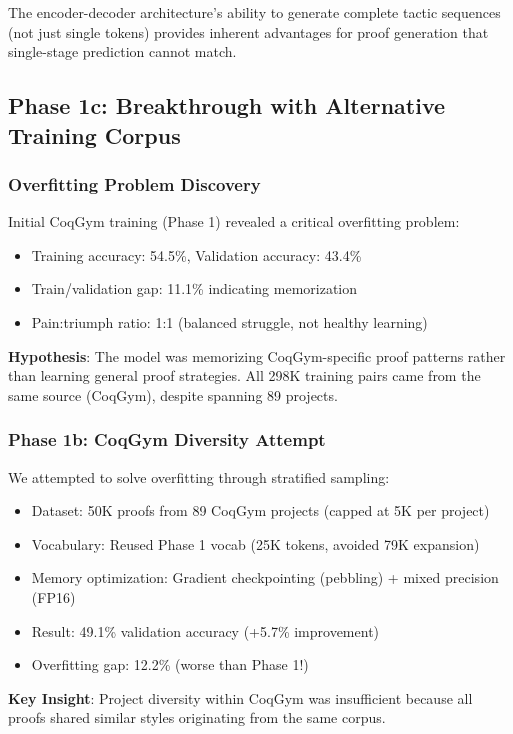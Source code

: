 \documentclass[12pt]{article}
\begin{document}
The encoder-decoder architecture's ability to generate complete tactic sequences (not just single tokens) provides inherent advantages for proof generation that single-stage prediction cannot match.

\subsection{Phase 1c: Breakthrough with Alternative Training Corpus}

\subsubsection{Overfitting Problem Discovery}

Initial CoqGym training (Phase 1) revealed a critical overfitting problem:
\begin{itemize}
\item Training accuracy: 54.5\%, Validation accuracy: 43.4\%
\item Train/validation gap: 11.1\% indicating memorization
\item Pain:triumph ratio: 1:1 (balanced struggle, not healthy learning)
\end{itemize}

\textbf{Hypothesis}: The model was memorizing CoqGym-specific proof patterns rather than learning general proof strategies. All 298K training pairs came from the same source (CoqGym), despite spanning 89 projects.

\subsubsection{Phase 1b: CoqGym Diversity Attempt}

We attempted to solve overfitting through stratified sampling:
\begin{itemize}
\item Dataset: 50K proofs from 89 CoqGym projects (capped at 5K per project)
\item Vocabulary: Reused Phase 1 vocab (25K tokens, avoided 79K expansion)
\item Memory optimization: Gradient checkpointing (pebbling) + mixed precision (FP16)
\item Result: 49.1\% validation accuracy (+5.7\% improvement)
\item Overfitting gap: 12.2\% (worse than Phase 1!)
\end{itemize}

\textbf{Key Insight}: Project diversity within CoqGym was insufficient because all proofs shared similar styles originating from the same corpus.
\end{document}
